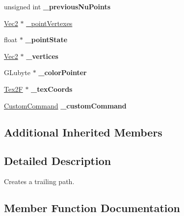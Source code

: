 \begin{DoxyCompactItemize}
unsigned int {\bfseries \+\_\+previous\+Nu\+Points}
\item 
\hyperlink{classVec2}{Vec2} $\ast$ \hyperlink{classMotionStreak_a8ff067fc94ea1c66ff07c60caf8fbd11}{\+\_\+point\+Vertexes}
\item 
\mbox{\label{classMotionStreak_a92564f9e73d1a5a0b11c3f71a4baaca3}} 
float $\ast$ {\bfseries \+\_\+point\+State}
\item 
\mbox{\label{classMotionStreak_af7422c7e106da000c04f2b9713dff341}} 
\hyperlink{classVec2}{Vec2} $\ast$ {\bfseries \+\_\+vertices}
\item 
\mbox{\label{classMotionStreak_ae7f1497ed0852927b3e98b4a60ee26be}} 
G\+Lubyte $\ast$ {\bfseries \+\_\+color\+Pointer}
\item 
\mbox{\label{classMotionStreak_afb1165c96cd0fd3535329dca8f2c65d1}} 
\hyperlink{structTex2F}{Tex2F} $\ast$ {\bfseries \+\_\+tex\+Coords}
\item 
\mbox{\label{classMotionStreak_a380810c181f2859cb138315abe97b0c0}} 
\hyperlink{classCustomCommand}{Custom\+Command} {\bfseries \+\_\+custom\+Command}
\end{DoxyCompactItemize}
\subsection*{Additional Inherited Members}


\subsection{Detailed Description}
Creates a trailing path. 

\subsection{Member Function Documentation}
\mbox{\label{classMotionStreak_aa8d7172cc57dc5cee559fa6bc35cfa48}} 
